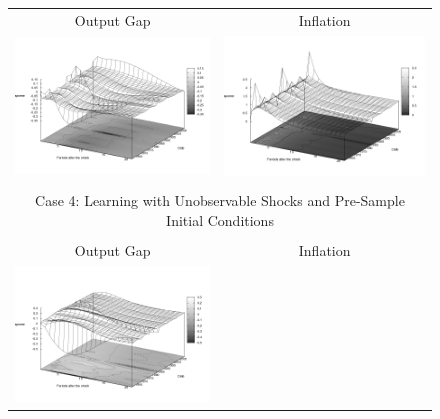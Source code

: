\begin{figure}
\begin{tabular}{cc}
Output Gap & Inflation \\ 
\includegraphics[scale=0.25]{results_reinit/Output_costshock_irf3d.png} & 
\includegraphics[scale=0.25]{results_reinit/Inflation_costshock_irf3d.png} \\ \\ 
\multicolumn{2}{c}{Case 4: Learning with Unobservable Shocks and Pre-Sample Initial Conditions}\\ \\
Output Gap & Inflation \\ 
\includegraphics[scale=0.25]{results_wlsinit/Output_costshock_irf3d.png} & 

\end{tabular}
\end{figure}
